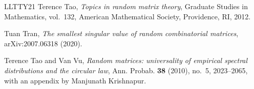\begin{thebibliography}{LLTTY21}
Terence Tao,
\emph{Topics in random matrix theory},
Graduate Studies in Mathematics, vol.~132,
American Mathematical Society, Providence, RI, 2012.

Tuan Tran,
\emph{The smallest singular value of random combinatorial matrices},
arXiv:2007.06318 (2020).

Terence Tao and Van Vu,
\emph{Random matrices: universality of empirical spectral distributions and the circular law},
Ann. Probab. \textbf{38} (2010), no.~5, 2023--2065,
with an appendix by Manjunath Krishnapur.

\end{thebibliography}
